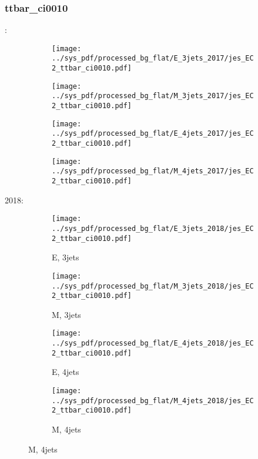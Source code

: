 \documentclass{beamer}
\begin{document}
\begin{frame}
\frametitle{ttbar_ci0010}
\fontsize{5}{1}:
\begin{figure}
\centering
\begin{subfigure}[b]{0.24\textwidth}
\texttt{[image: ../sys\_pdf/processed\_bg\_flat/E\_3jets\_2017/jes\_EC2\_ttbar\_ci0010.pdf]}
\end{subfigure}
\begin{subfigure}[b]{0.24\textwidth}
\texttt{[image: ../sys\_pdf/processed\_bg\_flat/M\_3jets\_2017/jes\_EC2\_ttbar\_ci0010.pdf]}
\end{subfigure}
\begin{subfigure}[b]{0.24\textwidth}
\texttt{[image: ../sys\_pdf/processed\_bg\_flat/E\_4jets\_2017/jes\_EC2\_ttbar\_ci0010.pdf]}
\end{subfigure}
\begin{subfigure}[b]{0.24\textwidth}
\texttt{[image: ../sys\_pdf/processed\_bg\_flat/M\_4jets\_2017/jes\_EC2\_ttbar\_ci0010.pdf]}
\end{subfigure}
\end{figure}
2018:
\begin{figure}
\centering
\begin{subfigure}[b]{0.24\textwidth}
\texttt{[image: ../sys\_pdf/processed\_bg\_flat/E\_3jets\_2018/jes\_EC2\_ttbar\_ci0010.pdf]}
\captionsetup{font=tiny}
\caption{E, 3jets}
\end{subfigure}
\begin{subfigure}[b]{0.24\textwidth}
\texttt{[image: ../sys\_pdf/processed\_bg\_flat/M\_3jets\_2018/jes\_EC2\_ttbar\_ci0010.pdf]}
\captionsetup{font=tiny}
\caption{M, 3jets}
\end{subfigure}
\begin{subfigure}[b]{0.24\textwidth}
\texttt{[image: ../sys\_pdf/processed\_bg\_flat/E\_4jets\_2018/jes\_EC2\_ttbar\_ci0010.pdf]}
\captionsetup{font=tiny}
\caption{E, 4jets}
\end{subfigure}
\begin{subfigure}[b]{0.24\textwidth}
\texttt{[image: ../sys\_pdf/processed\_bg\_flat/M\_4jets\_2018/jes\_EC2\_ttbar\_ci0010.pdf]}
\captionsetup{font=tiny}
\caption{M, 4jets}
\end{subfigure}
\end{figure}
\end{frame}
\end{document}
